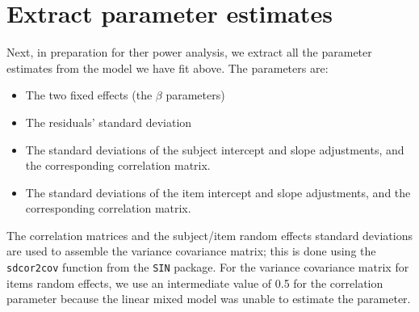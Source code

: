 \documentclass[12pt,]{krantz}
\newenvironment{Shaded}{\begin{snugshade}}{\end{snugshade}}
\newcommand{\CommentTok}[1]{\textcolor[rgb]{0.56,0.35,0.01}{\textit{#1}}}
\newcommand{\DataTypeTok}[1]{\textcolor[rgb]{0.13,0.29,0.53}{#1}}
\newcommand{\DecValTok}[1]{\textcolor[rgb]{0.00,0.00,0.81}{#1}}
\newcommand{\KeywordTok}[1]{\textcolor[rgb]{0.13,0.29,0.53}{\textbf{#1}}}
\newcommand{\NormalTok}[1]{#1}
\newcommand{\OperatorTok}[1]{\textcolor[rgb]{0.81,0.36,0.00}{\textbf{#1}}}
\newcommand{\StringTok}[1]{\textcolor[rgb]{0.31,0.60,0.02}{#1}}
\providecommand{\tightlist}{%
  \setlength{\itemsep}{0pt}\setlength{\parskip}{0pt}}
\begin{document}
\hypertarget{extract-parameter-estimates}{%
\section{Extract parameter estimates}\label{extract-parameter-estimates}}

Next, in preparation for ther power analysis, we extract all the parameter estimates from the model we have fit above. The parameters are:

\begin{itemize}
\tightlist
\item
  The two fixed effects (the \(\beta\) parameters)
\item
  The residuals' standard deviation
\item
  The standard deviations of the subject intercept and slope adjustments, and the corresponding correlation matrix.
\item
  The standard deviations of the item intercept and slope adjustments, and the corresponding correlation matrix.
\end{itemize}

The correlation matrices and the subject/item random effects standard deviations are used to assemble the variance covariance matrix; this is done using the \texttt{sdcor2cov} function from the \texttt{SIN} package. For the variance covariance matrix for items random effects, we use an intermediate value of 0.5 for the correlation parameter because the linear mixed model was unable to estimate the parameter.

\begin{Shaded}
\end{Shaded}
\end{document}
